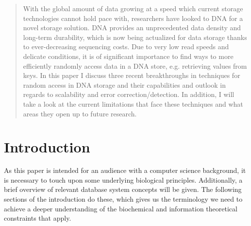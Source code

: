 \documentclass[a4paper,conference]{IEEEtran}
\begin{document}
\begin{abstract}
With the global amount of data growing at a speed which current storage technologies cannot hold pace with, researchers have looked to DNA for a novel storage solution. DNA provides an unprecedented data density and long-term durability, which is now being actualized for data storage thanks to ever-decreasing sequencing costs. Due to very low read speeds and delicate conditions, it is of significant importance to find ways to more efficiently randomly access data in a DNA store, e.g. retrieving values from keys. In this paper I discuss three recent breakthroughs in techniques for random access in DNA storage and their capabilities and outlook in regards to scalability and error correction/detection. In addition, I will take a look at the current limitations that face these techniques and what areas they open up to future research.
\end{abstract}





%
\IEEEpeerreviewmaketitle



\section{Introduction}
As this paper is intended for an audience with a computer science background, it is necessary to touch upon some underlying biological principles. Additionally, a brief overview of relevant database system concepts will be given. The following sections of the introduction do these, which gives us the terminology we need to achieve a deeper understanding of the biochemical and information theoretical constraints that apply.
\end{document}

